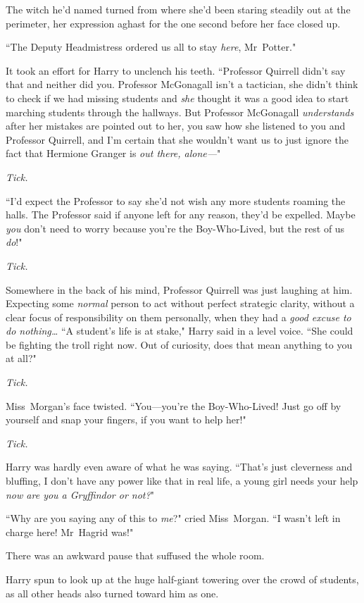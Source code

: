 The witch he'd named turned from where she'd been staring steadily out at the perimeter, her expression aghast for the one second before her face closed up.

``The Deputy Headmistress ordered us all to stay \emph{here}, Mr~Potter."

It took an effort for Harry to unclench his teeth. ``Professor Quirrell didn't say that and neither did you. Professor McGonagall isn't a tactician, she didn't think to check if we had missing students and \emph{she} thought it was a good idea to start marching students through the hallways. But Professor McGonagall \emph{understands} after her mistakes are pointed out to her, you saw how she listened to you and Professor Quirrell, and I'm certain that she wouldn't want us to just ignore the fact that Hermione Granger is \emph{out there, alone—}"

\emph{Tick.}

``I'd expect the Professor to say she'd not wish any more students roaming the halls. The Professor said if anyone left for any reason, they'd be expelled. Maybe \emph{you} don't need to worry because you're the Boy-Who-Lived, but the rest of us \emph{do}!"

\emph{Tick.}

Somewhere in the back of his mind, Professor Quirrell was just laughing at him. Expecting some \emph{normal} person to act without perfect strategic clarity, without a clear focus of responsibility on them personally, when they had a \emph{good excuse to do nothing{\ldots}} ``A student's life is at stake," Harry said in a level voice. ``She could be fighting the troll right now. Out of curiosity, does that mean anything to you at all?"

\emph{Tick.}

Miss~Morgan's face twisted. ``You—you're the Boy-Who-Lived! Just go off by yourself and snap your fingers, if you want to help her!"

\emph{Tick.}

Harry was hardly even aware of what he was saying. ``That's just cleverness and bluffing, I don't have any power like that in real life, a young girl needs your help \emph{now are you a Gryffindor or not?}"

``Why are you saying any of this to \emph{me}?" cried Miss~Morgan. ``I wasn't left in charge here! Mr~Hagrid was!"

There was an awkward pause that suffused the whole room.

Harry spun to look up at the huge half-giant towering over the crowd of students, as all other heads also turned toward him as one.

